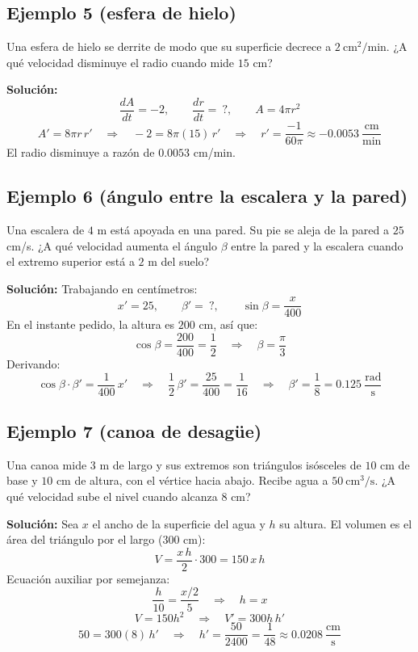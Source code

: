 \documentclass[12pt]{article}
\begin{document}
\subsection{Ejemplo 5 (esfera de hielo)}
Una esfera de hielo se derrite de modo que su superficie decrece a $2\ \text{cm}^2/\text{min}$. ¿A qué velocidad disminuye el radio cuando mide $15$ cm?

\textbf{Solución:}
\[
\frac{dA}{dt} = -2, \qquad \frac{dr}{dt} = \ ?, \qquad A = 4\pi r^2
\]
\[
A' = 8\pi r \, r' \quad \Rightarrow \quad -2 = 8\pi (15)\, r' \quad \Rightarrow \quad r' = \frac{-1}{60\pi} \approx -0.0053\ \frac{\text{cm}}{\text{min}}
\]
El radio disminuye a razón de $0.0053$ cm/min.

\subsection{Ejemplo 6 (ángulo entre la escalera y la pared)}
Una escalera de $4$ m está apoyada en una pared. Su pie se aleja de la pared a $25$ cm/s. ¿A qué velocidad aumenta el ángulo $\beta$ entre la pared y la escalera cuando el extremo superior está a $2$ m del suelo?

\textbf{Solución:} Trabajando en centímetros:
\[
x' = 25, \qquad \beta' = \ ?, \qquad \sin\beta = \frac{x}{400}
\]
En el instante pedido, la altura es $200$ cm, así que:
\[
\cos\beta = \frac{200}{400} = \frac{1}{2} \quad \Rightarrow \quad \beta = \frac{\pi}{3}
\]
Derivando:
\[
\cos\beta \cdot \beta' = \frac{1}{400} \, x' \quad \Rightarrow \quad \frac{1}{2}\,\beta' = \frac{25}{400} = \frac{1}{16} \quad \Rightarrow \quad \beta' = \frac{1}{8} = 0.125\ \frac{\text{rad}}{\text{s}}
\]

\subsection{Ejemplo 7 (canoa de desagüe)}
Una canoa mide $3$ m de largo y sus extremos son triángulos isósceles de $10$ cm de base y $10$ cm de altura, con el vértice hacia abajo. Recibe agua a $50\ \text{cm}^3/\text{s}$. ¿A qué velocidad sube el nivel cuando alcanza $8$ cm?

\textbf{Solución:} Sea $x$ el ancho de la superficie del agua y $h$ su altura. El volumen es el área del triángulo por el largo ($300$ cm):
\[
V = \frac{x\,h}{2} \cdot 300 = 150\,x\,h
\]
Ecuación auxiliar por semejanza:
\[
\frac{h}{10} = \frac{x/2}{5} \quad \Rightarrow \quad h = x
\]
\[
V = 150h^2 \quad \Rightarrow \quad V' = 300h \, h'
\]
\[
50 = 300(8)\,h' \quad \Rightarrow \quad h' = \frac{50}{2400} = \frac{1}{48} \approx 0.0208\ \frac{\text{cm}}{\text{s}}
\]
\end{document}
